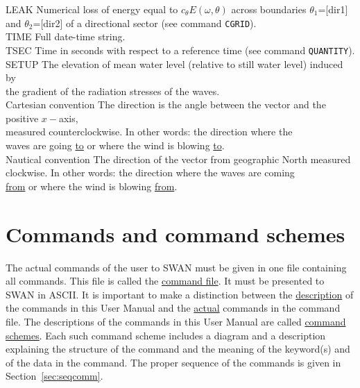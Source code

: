 \documentclass[12pt]{book}
\begin{document}
\begin{tabbing}
LEAK                 \> Numerical loss of energy equal to $c_{\theta}E(\omega,\theta)$ across boundaries $\theta_1$=[dir1]\+\\
                        and $\theta_2$=[dir2] of a directional sector (see command {\tt CGRID}).\-\\
TIME                 \> Full date-time string.\\
TSEC                 \> Time in seconds with respect to a reference time (see command {\tt QUANTITY}).\\
SETUP                \> The elevation of mean water level (relative to still water level) induced by\+\\
                        the gradient of the radiation stresses of the waves.\-\\
Cartesian convention \> The direction is the angle between the vector and the positive $x-$axis,\+\\
                        measured counterclockwise. In other words: the direction where the\\
                        waves are going {\underline {to}} or where the wind is blowing {\underline {to}}.\-\\
Nautical convention  \> The direction of the vector from geographic North measured\+\\
                        clockwise. In other words: the direction where the waves are coming\\
                        {\underline {from}} or where the wind is blowing {\underline {from}}.\-\\
\end{tabbing}

 \label{app:syntax}

\section{Commands and command schemes}

The actual commands of the user to SWAN must be given in one file containing all commands. This file is called the
\underline{command file}. It must be presented to SWAN in ASCII. It is important to make a distinction between the
\underline{description} of the commands in this User Manual and the \underline{actual} commands in the command file.
The descriptions of the commands in this User Manual are called \underline{command schemes}. Each such command scheme
includes a diagram and a description explaining the structure of the command and the meaning of the keyword(s) and
of the data in the command.  The proper sequence of the commands is given in Section~\ref{sec:seqcomm}.
\end{document}
